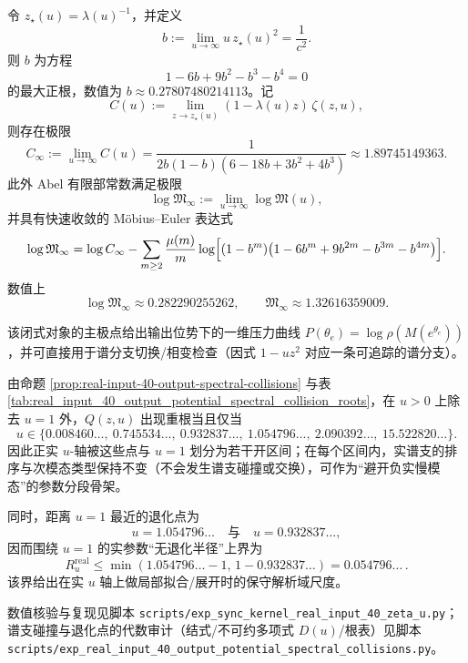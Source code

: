 \begin{proposition}[极端偏置的有限部常数极限]\label{prop:real-input-40-logM-infty}
令 $z_\star(u)=\lambda(u)^{-1}$，并定义
\[
b:=\lim_{u\to\infty}u\,z_\star(u)^2=\frac{1}{c^2}.
\]
则 $b$ 为方程
\[
1-6b+9b^2-b^3-b^4=0
\]
的最大正根，数值为 $b\approx 0.27807480214113$。记
\[
C(u):=\lim_{z\to z_\star(u)}(1-\lambda(u)z)\,\zeta(z,u),
\]
则存在极限
\[
C_\infty:=\lim_{u\to\infty}C(u)=\frac{1}{2b(1-b)(6-18b+3b^2+4b^3)}\approx 1.89745149363.
\]
此外 Abel 有限部常数满足极限
\[
\log\mathfrak{M}_\infty:=\lim_{u\to\infty}\log\mathfrak{M}(u),
\]
并具有快速收敛的 Möbius--Euler 表达式
\[
\log\mathfrak{M}_\infty
=\log C_\infty
-\sum_{m\ge 2}\frac{\mu(m)}{m}\log\Bigl[(1-b^m)\bigl(1-6b^m+9b^{2m}-b^{3m}-b^{4m}\bigr)\Bigr].
\]
数值上
\[
\log\mathfrak{M}_\infty\approx 0.282290255262,\qquad
\mathfrak{M}_\infty\approx 1.32616359009.
\]
\end{proposition}
该闭式对象的主极点给出输出位势下的一维压力曲线 $P(\theta_e)=\log\rho(M(e^{\theta_e}))$，并可直接用于谱分支切换/相变检查（因式 $1-uz^2$ 对应一条可追踪的谱分支）。




\begin{remark}[正实退化点的相图区间与实参数半径]\label{rem:real-input-40-output-potential-degeneracy-phase}
由命题 \ref{prop:real-input-40-output-spectral-collisions} 与表 \ref{tab:real_input_40_output_potential_spectral_collision_roots}，在 \(u>0\) 上除去 \(u=1\) 外，\(Q(z,u)\) 出现重根当且仅当
\[
u\in\{0.008460\ldots,\ 0.745534\ldots,\ 0.932837\ldots,\ 1.054796\ldots,\ 2.090392\ldots,\ 15.522820\ldots\}.
\]
因此正实 \(u\)-轴被这些点与 \(u=1\) 划分为若干开区间；在每个区间内，实谱支的排序与次模态类型保持不变（不会发生谱支碰撞或交换），可作为“避开负实慢模态”的参数分段骨架。
\par
同时，距离 \(u=1\) 最近的退化点为
\[
u=1.054796\ldots\quad\text{与}\quad u=0.932837\ldots,
\]
因而围绕 \(u=1\) 的实参数“无退化半径”上界为
\[
R_u^{\mathrm{real}}\le \min(1.054796\ldots-1,\,1-0.932837\ldots)=0.054796\ldots\,.
\]
该界给出在实 \(u\) 轴上做局部拟合/展开时的保守解析域尺度。
\end{remark}

数值核验与复现见脚本 \texttt{scripts/exp\_sync\_kernel\_real\_input\_40\_zeta\_u.py}；谱支碰撞与退化点的代数审计（结式/不可约多项式 $D(u)$/根表）见脚本 \texttt{scripts/exp\_real\_input\_40\_output\_potential\_spectral\_collisions.py}。
